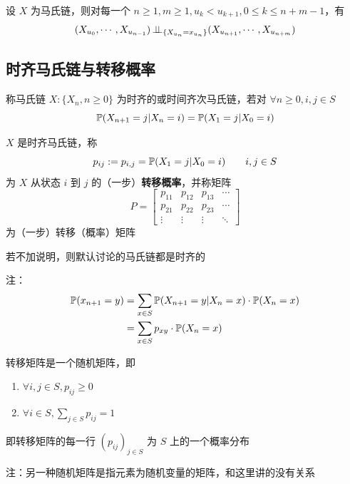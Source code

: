 \begin{corollary}
    设 $X$ 为马氏链，则对每一个 $n\geq 1,m\geq 1, u_k<u_{k+1}, 0\leq k\leq n+m-1$，有
    \[
    (X_{u_0},\cdots,X_{u_{n-1}})\operatorname{\perp\!\!\!\perp}_{\{X_{u_n}=x_{u_n}\}}(X_{u_{n+1}},\cdots,X_{u_{n+m}})
    \]
\end{corollary}

\subsection{时齐马氏链与转移概率}

\begin{definition}[时间齐次马氏链]
    称马氏链 $X:\{X_n,n\geq 0\}$ 为时齐的或时间齐次马氏链，若对 $\forall n\geq 0, i,j\in S$
    \[
    \mathbb{P}(X_{n+1}=j|X_n=i)=\mathbb{P}(X_1=j|X_0=i)
    \]
\end{definition}

\begin{definition}
    $X$ 是时齐马氏链，称
    \[
    p_{ij}:=p_{i,j}=\mathbb{P}(X_1=j|X_0=i)\qquad i,j\in S
    \]
    为 $X$ 从状态 $i$ 到 $j$ 的（一步）\textbf{转移概率}，并称矩阵
    \[
    P=\begin{bmatrix}
        p_{11} & p_{12} & p_{13} & \cdots\\
        p_{21} & p_{22} & p_{23} & \cdots\\
        \vdots & \vdots & \vdots & \ddots
    \end{bmatrix}
    \]
    为（一步）转移（概率）矩阵
\end{definition}

若不加说明，则默认讨论的马氏链都是时齐的

注：
\[
\begin{aligned}
    \mathbb{P}(x_{n+1}=y)&=\sum_{x\in S}\mathbb{P}(X_{n+1}=y|X_n=x)\cdot \mathbb{P}(X_n=x)\\
    &=\sum_{x\in S}p_{xy}\cdot \mathbb{P}(X_n=x)
\end{aligned}
\]

\begin{theorem}[转移矩阵的刻画]\label{thm:random_matrix}
    转移矩阵是一个随机矩阵，即
    \begin{enumerate}
        \item $\forall i,j\in S,p_{ij}\geq 0$
        \item $\forall i\in S,\sum_{j\in S}p_{ij}=1$
    \end{enumerate}
    即转移矩阵的每一行 $(p_{ij})_{j\in S}$ 为 $S$ 上的一个概率分布

    注：另一种随机矩阵是指元素为随机变量的矩阵，和这里讲的没有关系
\end{theorem}

